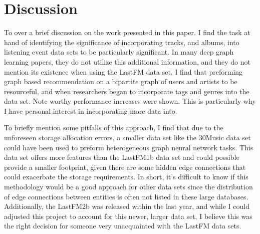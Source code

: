 \section{Discussion}
To over a brief discussion on the work presented in this paper. I find the task at hand of identifying the significance of incorporating tracks, and albums, into listening event data sets to be particularly significant. In many deep graph learning papers, they do not utilize this additional information, and they do not mention its existence when using the LastFM data set. I find that preforming graph based recommendation on a bipartite graph of users and artists to be resourceful, and when researchers began to incorporate tags and genres into the data set. Note worthy performance increases were shown. This is particularly why I have personal interest in incorporating more data into.

To briefly mention some pitfalls of this approach, I find that due to the unforeseen storage allocation errors, a smaller data set like the 30Music data set could have been used to preform heterogeneous graph neural network tasks. This data set offers more features than the LastFM1b data set and could possible provide a smaller footprint, given there are some hidden edge connections that could exacerbate the storage requirements. In short, it's difficult to know if this methodology would be a good approach for other data sets since the distribution of edge connections between entities is often not listed in these large databases. Additionally, the LastFM2b was released within the last year, and while I could adjusted this project to account for this newer, larger data set, I believe this was the right decision for someone very unacquainted with the LastFM data sets.